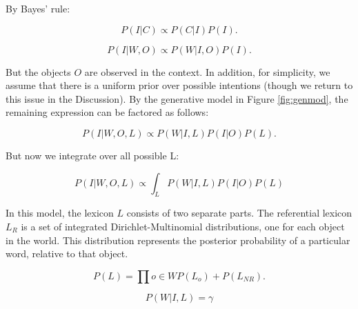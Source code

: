 \documentclass[man,noapacite]{apa2}
\begin{document}
By Bayes' rule:

\begin{equation}
P( I| C) \propto P(C | I) P(I).
\end{equation}


\begin{equation}
P( I| W, O) \propto P(W | I, O) P(I).
\end{equation}

\noindent But the objects $O$ are observed in the context. In addition, for simplicity, we assume that there is a uniform prior over possible intentions (though we return to this issue in the Discussion). By the generative model in Figure \ref{fig:genmod}, the remaining expression can be factored as follows:

\begin{equation}
P( I| W, O, L) \propto P(W | I, L) P(I | O) P(L).
\end{equation}

But now we integrate over all possible L:

\begin{equation}
P( I| W, O, L) \propto \int_L{P(W | I, L) P(I | O) P(L)}
\end{equation}


In this model, the lexicon $L$ consists of two separate parts. The referential lexicon $L_R$ is a set of integrated Dirichlet-Multinomial distributions, one for each object in the world. This distribution represents the posterior probability of a particular word, relative to that object. 

\begin{equation}
P(L) = \prod{o \in W}{P(L_o)} + P(L_{NR}).
\end{equation}

 

\begin{equation}
P(W | I, L) = \gamma  
\end{equation}
\end{document}
